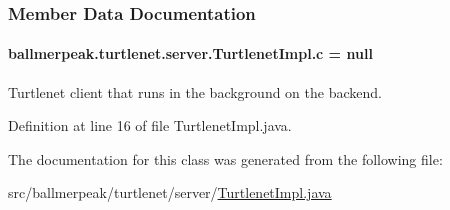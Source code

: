 \subsubsection{Member Data Documentation}
\hypertarget{classballmerpeak_1_1turtlenet_1_1server_1_1TurtlenetImpl_a8e8797ccc45aa68a72f8349c4eaf84ca}{
\paragraph[{c}]{ ballmerpeak.\-turtlenet.\-server.\-Turtlenet\-Impl.\-c = null\hspace{0.3cm}{\ttfamily [package]}}}\label{classballmerpeak_1_1turtlenet_1_1server_1_1TurtlenetImpl_a8e8797ccc45aa68a72f8349c4eaf84ca}


Turtlenet client that runs in the background on the backend. 



Definition at line 16 of file Turtlenet\-Impl.\-java.



The documentation for this class was generated from the following file\-:\begin{DoxyCompactItemize}
\item 
src/ballmerpeak/turtlenet/server/\hyperlink{TurtlenetImpl_8java}{Turtlenet\-Impl.\-java}\end{DoxyCompactItemize}
